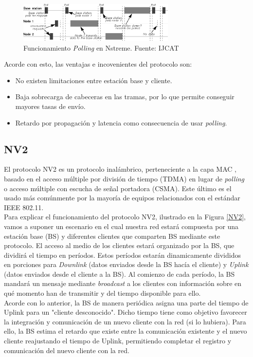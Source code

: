 		\begin{figure}[H]
			\centering
			\includegraphics[width=0.7\textwidth]{img/Polling.png}
			\caption{Funcionamiento \textit{Polling} en Nstreme. Fuente: IJCAT}
			\label{Nstreme}
		\end{figure}
		
		Acorde con esto, las ventajas e incovenientes del protocolo son:
		\begin{itemize}
			\item No existen limitaciones entre estación base y cliente.
			\item Baja sobrecarga de cabeceras en las tramas, por lo que permite conseguir mayores tasas de envío.
			\item Retardo por propagación y latencia como consecuencia de usar \textit{polling}.
		\end{itemize}

		\subsection{NV2}
		El protocolo NV2 es un protocolo inalámbrico, perteneciente a la capa MAC \cite{MacLayer}, basado en el acceso múltiple por división de tiempo (TDMA) en lugar de \textit{polling} o acceso múltiple con escucha de señal portadora (CSMA). Este último es el usado más comúnmente por la mayoría de equipos relacionados con el estándar IEEE 802.11.\\
		
		Para explicar el funcionamiento del protocolo NV2, ilustrado en la Figura \ref{NV2}, vamos a suponer un escenario en el cual nuestra red estará compuesta por una estación base (BS) y diferentes clientes que comparten BS mediante este protocolo. El acceso al medio de los clientes estará organizado por la BS, que dividirá el tiempo en períodos. Estos períodos estarán dinamicamente divididos en porciones para \textit{Downlink} (datos enviados desde la BS hacía el cliente) y \textit{Uplink} (datos enviados desde el cliente a la BS). Al comienzo de cada período, la BS mandará un mensaje mediante \textit{broadcast} a los clientes con información sobre en qué momento han de transmitir y del tiempo disponible para ello. \\
		Acorde con lo anterior, la BS de manera periódica asigna una parte del tiempo de Uplink para un "cliente desconocido". Dicho tiempo tiene como objetivo favorecer la integración y comunicación de un nuevo cliente con la red (si lo hubiera). Para ello, la BS estima el retardo que existe entre la comunicación existente y el nuevo cliente reajustando el tiempo de Uplink, permitiendo completar el registro y comunicación del nuevo cliente con la red.
		

